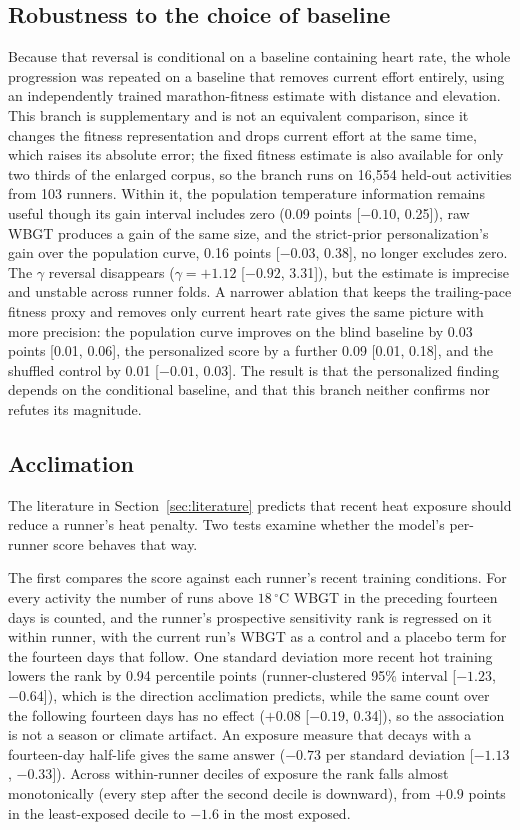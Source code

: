 \documentclass[11pt]{article}
\renewcommand{\_}{\textunderscore\allowbreak}
\begin{document}
\subsection{Robustness to the choice of baseline}

Because that reversal is conditional on a baseline containing heart rate, the whole progression was repeated on a baseline that removes current effort entirely, using an independently trained marathon-fitness estimate with distance and elevation. This branch is supplementary and is not an equivalent comparison, since it changes the fitness representation and drops current effort at the same time, which raises its absolute error; the fixed fitness estimate is also available for only two thirds of the enlarged corpus, so the branch runs on 16{,}554 held-out activities from 103 runners. Within it, the population temperature information remains useful though its gain interval includes zero (0.09 points [$-0.10$, 0.25]), raw WBGT produces a gain of the same size, and the strict-prior personalization's gain over the population curve, 0.16 points [$-0.03$, 0.38], no longer excludes zero. The $\gamma$ reversal disappears ($\gamma = +1.12$ [$-0.92$, 3.31]), but the estimate is imprecise and unstable across runner folds. A narrower ablation that keeps the trailing-pace fitness proxy and removes only current heart rate gives the same picture with more precision: the population curve improves on the blind baseline by 0.03 points [0.01, 0.06], the personalized score by a further 0.09 [0.01, 0.18], and the shuffled control by 0.01 [$-0.01$, 0.03]. The result is that the personalized finding depends on the conditional baseline, and that this branch neither confirms nor refutes its magnitude.

\subsection{Acclimation}


The literature in Section~\ref{sec:literature} predicts that recent heat exposure should reduce a runner's heat penalty. Two tests examine whether the model's per-runner score behaves that way.

The first compares the score against each runner's recent training conditions. For every activity the number of runs above $18\,^{\circ}$C WBGT in the preceding fourteen days is counted, and the runner's prospective sensitivity rank is regressed on it within runner, with the current run's WBGT as a control and a placebo term for the fourteen days that follow. One standard deviation more recent hot training lowers the rank by 0.94 percentile points (runner-clustered 95\% interval [$-1.23$, $-0.64$]), which is the direction acclimation predicts, while the same count over the following fourteen days has no effect ($+0.08$ [$-0.19$, 0.34]), so the association is not a season or climate artifact. An exposure measure that decays with a fourteen-day half-life gives the same answer ($-0.73$ per standard deviation [$-1.13$, $-0.33$]). Across within-runner deciles of exposure the rank falls almost monotonically (every step after the second decile is downward), from $+0.9$ points in the least-exposed decile to $-1.6$ in the most exposed.
\end{document}
